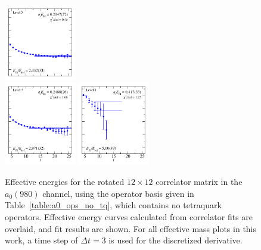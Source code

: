 \begin{figure}
  \includegraphics[width=0.28\textwidth]{figures/spectrum_a1gm/no_tq/fits/fit_4.pdf}\\
  \includegraphics[width=0.28\textwidth]{figures/spectrum_a1gm/no_tq/fits/fit_7.pdf}
  \includegraphics[width=0.28\textwidth]{figures/spectrum_a1gm/no_tq/fits/fit_8.pdf}\\
  \caption{Effective energies for the rotated $12\times 12$ correlator matrix in the $a_0(980)$ channel, using the operator basis given in Table~\ref{table:a0_ops_no_tq}, which contains no tetraquark operators. Effective energy curves calculated from correlator fits are overlaid, and fit results are shown. For all effective mass plots in this work, a time step of $\Delta t = 3$ is used for the discretized derivative.}
  \label{fig:a0_no_tq_grid}
\end{figure}

